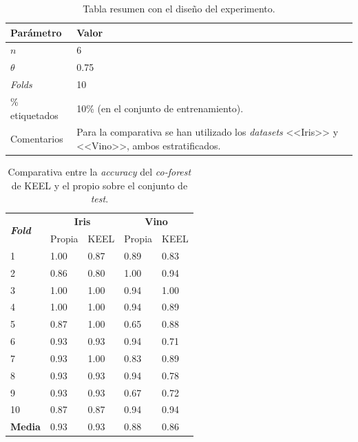 \begin{table}
	\begin{centering}
		\begin{tabular}{@{}p{10em} p{20em} @{}}
			\toprule
			\textbf{Parámetro} & \textbf{Valor} \\ 
			\midrule
			$n$ & 6\\
			$\theta$ & 0.75 \\
			\textit{Folds} & 10 \\
			\% etiquetados & 10\% (en el conjunto de entrenamiento). \\
			Comentarios & Para la comparativa se han utilizado los \textit{datasets} <<Iris>> y <<Vino>>, ambos estratificados.\\
			\bottomrule
			
		\end{tabular}
	\end{centering}
	\caption{Tabla resumen con el diseño del experimento.}
	\label{tabla_coforest_keelvsnuestro_diseño}	
\end{table}

\begin{table}
	\begin{centering}
		
		\begin{tabular}{@{} p{4em} p{5em} p{7em} p{7em} p{7em} @{}}
			\toprule
			\multirow{2}{*}{\textbf{\textit{ \hfil Fold}}} & \multicolumn{2}{c}{\hfil \textbf{Iris}}& \multicolumn{2}{c}{\hfil \textbf{Vino}} \\
			\cmidrule{2-3} \cmidrule{4-5}
			& \hfil Propia & \hfil KEEL & \hfil Propia & \hfil KEEL\\ 
			\toprule
			\hfil 1 &\hfil 1.00	&\hfil 0.87	& \hfil 0.89  & \hfil0.83 \\
			\hfil 2 &\hfil 0.86	&\hfil 0.80	& \hfil 1.00 	&  \hfil 0.94 \\
			\hfil 3 & \hfil 1.00	& \hfil 1.00	& \hfil 0.94	& \hfil 1.00 \\
			\hfil 4 & \hfil 1.00	& \hfil 1.00	& \hfil 0.94	& \hfil 0.89 \\
			\hfil 5 & \hfil 0.87	& \hfil 1.00	& \hfil 0.65	& \hfil 0.88 \\
			\hfil 6 & \hfil 0.93	& \hfil 0.93	& \hfil 0.94	& \hfil 0.71 \\
			\hfil 7 & \hfil 0.93	& \hfil 1.00	& \hfil 0.83	& \hfil 0.89 \\
			\hfil 8 & \hfil 0.93	& \hfil 0.93	& \hfil 0.94	& \hfil 0.78 \\
			\hfil 	9 & \hfil 0.93	& \hfil 0.93	& \hfil 0.67	& \hfil 0.72 \\
			\hfil 10& \hfil 0.87	& \hfil 0.87	& \hfil 0.94	& \hfil 0.94 \\
			\midrule
			\hfil \textbf{Media} 			& \hfil 0.93	& \hfil 0.93	& \hfil 0.88	& \hfil 0.86 \\
			\bottomrule
		\end{tabular}
	\end{centering}
	\caption{Comparativa entre la \textit{accuracy} del \textit{co-forest} de KEEL y el propio sobre el conjunto de \textit{test}.}
	\label{tabla_coforest_keelvsnuestro}	
\end{table}

